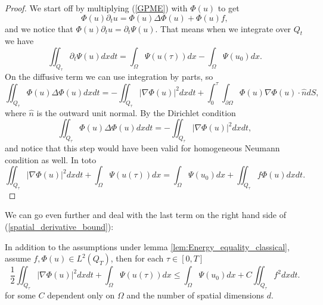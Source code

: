 \documentclass[11pt, a4paper]{article}
\begin{document}
\begin{proof}
We start off by multiplying (\ref{GPME}) with $\Phi(u)$ to get
\begin{equation*}
\Phi(u)\partial_t u = \Phi(u)\Delta \Phi(u) + \Phi(u)f,
\end{equation*}
and we notice that $\Phi(u)\partial_t u = \partial_t \Psi(u)$. That means when we integrate over $Q_t$ we have
\begin{equation*}
\iint_{Q_\tau} \partial_t \Psi(u)dxdt = \int_\Omega \Psi(u(\tau))dx - \int_\Omega \Psi(u_0)dx.
\end{equation*}
On the diffusive term we can use integration by parts, so
\begin{equation*}
\iint_{Q_\tau}\Phi(u) \Delta \Phi(u) dxdt = -\iint_{Q_\tau} |\nabla \Phi(u)|^2dxdt + \int_0^\tau \int_{\partial\Omega} \Phi(u)\nabla \Phi(u) \cdot \hat{n}dS,
\end{equation*}
where $\hat{n}$ is the outward unit normal. By the Dirichlet condition
\begin{equation*}
\iint_{Q_\tau}\Phi(u) \Delta \Phi(u) dxdt = -\iint_{Q_\tau} |\nabla \Phi(u)|^2dxdt,
\end{equation*}
and notice that this step would have been valid for homogeneous Neumann condition as well. In toto 
\begin{equation*}
\iint_{Q_\tau} |\nabla \Phi(u)|^2dxdt + \int_\Omega \Psi(u(\tau))dx = \int_\Omega \Psi(u_0)dx + \iint_{Q_\tau} f\Phi(u)dxdt.
\end{equation*}
\end{proof}
\setcounter{obs}{0}

We can go even further and deal with the last term on the right hand side of (\ref{spatial_derivative_bound}):

\begin{cor}
\label{cor:spatial_bound_w_poincare}
In addition to the assumptions under lemma \ref{lem:Energy_equality_classical}, assume $f,\Phi(u) \in L^2(Q_T)$, then for each $\tau \in [0,T]$
\begin{equation}
\label{spatial_derivative_bound_w_poaincare}
\frac{1}{2}\iint_{Q_\tau}|\nabla \Phi(u)|^2dxdt + \int_\Omega \Psi(u(\tau))dx \leq \int_\Omega \Psi(u_0)dx + C\iint_{Q_\tau}f^2dxdt.
\end{equation}
for some $C$ dependent only on $\Omega$ and the number of spatial dimensions $d$.
\end{cor}
\end{document}
